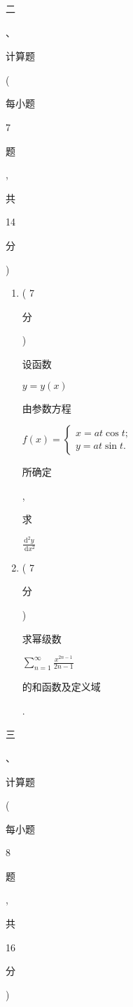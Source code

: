 \documentclass[10pt]{article}
\begin{document}
\begin{CJK}{UTF8}{mj}二\end{CJK}、\begin{CJK}{UTF8}{mj}计算题\end{CJK}(\begin{CJK}{UTF8}{mj}每小题\end{CJK} 7 \begin{CJK}{UTF8}{mj}题\end{CJK}, \begin{CJK}{UTF8}{mj}共\end{CJK} 14 \begin{CJK}{UTF8}{mj}分\end{CJK})

\begin{enumerate}
  \item ( 7 \begin{CJK}{UTF8}{mj}分\end{CJK}) \begin{CJK}{UTF8}{mj}设函数\end{CJK} $y=y(x)$ \begin{CJK}{UTF8}{mj}由参数方程\end{CJK} $f(x)=\left\{\begin{array}{l}x=a t \cos t ; \\ y=a t \sin t .\end{array}\right.$ \begin{CJK}{UTF8}{mj}所确定\end{CJK}, \begin{CJK}{UTF8}{mj}求\end{CJK} $\frac{\mathrm{d}^{2} y}{\mathrm{~d} x^{2}}$

  \item ( 7 \begin{CJK}{UTF8}{mj}分\end{CJK}) \begin{CJK}{UTF8}{mj}求幂级数\end{CJK} $\sum_{n=1}^{\infty} \frac{x^{2 n-1}}{2 n-1}$ \begin{CJK}{UTF8}{mj}的和函数及定义域\end{CJK}.

\end{enumerate}
\begin{CJK}{UTF8}{mj}三\end{CJK}、\begin{CJK}{UTF8}{mj}计算题\end{CJK}(\begin{CJK}{UTF8}{mj}每小题\end{CJK} 8 \begin{CJK}{UTF8}{mj}题\end{CJK}, \begin{CJK}{UTF8}{mj}共\end{CJK} 16 \begin{CJK}{UTF8}{mj}分\end{CJK})
\end{document}
